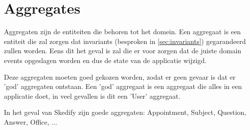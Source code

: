 
\section{Aggregates}
\label{sec:aggregates}

Aggregaten zijn de entiteiten die behoren tot het domein. Een aggregaat is een entiteit die zal zorgen dat invariants (besproken in \ref{sec:invariants}) gegarandeerd zullen worden. Eens dit het geval is zal die er voor zorgen dat de juiste domain events opgeslagen worden en dus de state van de applicatie wijzigd.

Deze aggregaten moeten goed gekozen worden, zodat er geen gevaar is dat er 'god' aggregaten ontstaan. Een 'god' aggregaat is een aggregaat die alles in een applicatie doet, in veel gevallen is dit een 'User' aggregaat.

In het geval van Skedify zijn goede aggregaten: Appointment, Subject, Question, Answer, Office, ...